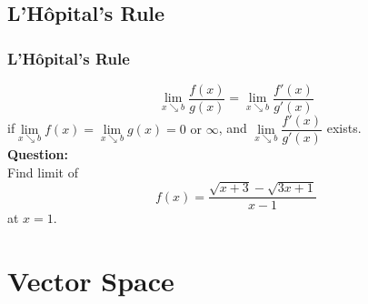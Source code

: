 \documentclass[10pt, t]{beamer}
\newcommand{\nullspace}{~\\[15pt]}
\begin{document}
\subsection{L’Hôpital’s Rule}
\begin{frame}
    \frametitle{L’Hôpital’s Rule}
    $$\underset{x\searrow b}{\lim}\dfrac{f(x)}{g(x)}=\underset{x\searrow b}{\lim}\dfrac{f'(x)}{g'(x)}$$
    if$\underset{x\searrow b}{\lim}f(x)=\underset{x\searrow b}{\lim}g(x)=0 \text{ or }\infty$, and $\underset{x\searrow b}{\lim}\dfrac{f'(x)}{g'(x)}$ exists.
    \nullspace
    \textbf{Question: }\\
    Find limit of $$f(x)=\frac{\sqrt{x+3}-\sqrt{3 x+1}}{x-1}$$ at $x=1$.
\end{frame}

\section{Vector Space}
\end{document}
